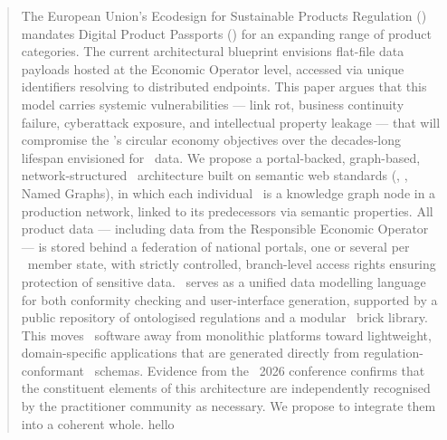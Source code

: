 \begin{abstract}
The European Union's Ecodesign for Sustainable Products Regulation (\ESPR)
mandates Digital Product Passports (\DPPs) for an expanding range of product
categories. The current architectural blueprint envisions flat-file data
payloads hosted at the Economic Operator level, accessed via unique identifiers
resolving to distributed endpoints. This paper argues that this model carries
systemic vulnerabilities --- link rot, business continuity failure, cyberattack
exposure, and intellectual property leakage --- that will compromise the \ESPR's
circular economy objectives over the decades-long lifespan envisioned for \DPP\
data. We propose a portal-backed, graph-based,
network-structured \DPP\ architecture built on semantic web standards (\RDF,
\JSONLD, Named Graphs), in which each individual \DPP\ is a knowledge graph node
in a production network, linked to its predecessors via semantic properties. All
product data --- including data from the Responsible Economic Operator --- is
stored behind a federation of national portals, one or several per \EU\ member
state, with
strictly controlled, branch-level access rights ensuring
protection of sensitive data. \SHACL\ serves as a unified data modelling
language for both conformity checking and user-interface generation, supported
by a public repository of ontologised regulations and a modular \SHACL\ brick
library. This moves \DPP\ software away from monolithic platforms toward
lightweight, domain-specific applications that are generated directly from
regulation-conformant \SHACL\ schemas. Evidence from the \DPPforEU~2026 conference confirms that the
constituent elements of this architecture are independently recognised by the
practitioner community as necessary. We propose to integrate them into a
coherent whole. hello
\end{abstract}
